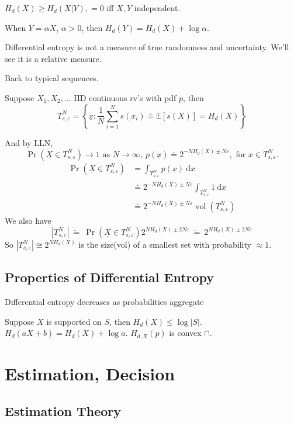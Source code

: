 \documentclass{report}
\newcommand{\idf}{\ \mathrm{d}}
\newcommand{\set}[1]{\left\lbrace #1 \right\rbrace}
\newcommand{\ddoteq}{\ \ddot{=}\ }
\theoremstyle{definition}
\theoremstyle{remark}
\numberwithin{equation}{section}
\begin{document}
$H_d(X) \geq H_d(X|Y), = 0$ iff $X, Y$ independent.

When $Y = \alpha X$, $\alpha > 0$, then $H_d(Y) = H_d(X) + \log \alpha$.

Differential entropy is not a measure of true randomness and uncertainty. We'll see it is a relative measure.

Back to typical sequences.

Suppose $X_1, X_2, \ldots$ IID continuous rv's with pdf $p$, then \[
T_{s,\varepsilon}^N = \set{\underline{x}: \frac{1}{N}\sum_{i=1}^N s(x_i) \doteq \mathbb E [s(X)] = H_d(X)}  
\]

And by LLN, \[
\Pr(\underline{X} \in T_{s,\varepsilon}^N) \to 1 \text{ as } N \to \infty,\ p(\underline{x}) \doteq 2^{-NH_d(X)\pm N\varepsilon}, \text{ for } x \in T_{s, \varepsilon}^N.
\]
\begin{align*}
  \Pr\left(\underline{X} \in T_{s,\varepsilon}^N\right) & = \int_{T_{s, \varepsilon}^N}p(\underline{x}) \idf x \\
  & \doteq 2^{-NH_d(X)\pm N\varepsilon} \int_{T_{s, \varepsilon}^N} 1 \idf x \\
  & \doteq 2^{-NH_d(X)\pm N\varepsilon} \operatorname{vol}(T_{s, \varepsilon}^N)
\end{align*}
We also have \[|T_{s,\varepsilon}^N| \ddoteq \Pr(\underline{X} \in T_{s, \varepsilon}^N)2^{NH_d(X)\pm2N\varepsilon}\ddoteq 2^{NH_d(X)\pm2N\varepsilon}\]
So \(|T_{s,\varepsilon}^N| \cong 2^{NH_d(X)}\) is the size(vol) of a smallest set with probability $\approx 1$.

\section{Properties of Differential Entropy}

Differential entropy decreases as probabilities aggregate

Suppose $X$ is supported on $S$, then $H_d(X) \leq \log |S|$.
$H_{d}(aX+b) = H_d(X) + \log a$.
$H_{d, X}(p)$ is convex $\cap$.

\chapter{Estimation, Decision}

\section{Estimation Theory}
\end{document}
